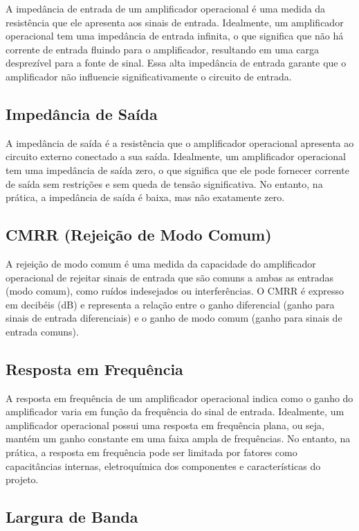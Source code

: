 \documentclass[12pt,twoside, a4paper, twocolumn]{article}
\begin{document}
A impedância de entrada de um amplificador operacional é uma medida da resistência que ele apresenta aos sinais de entrada. Idealmente, um amplificador operacional tem uma impedância de entrada infinita, o que significa que não há corrente de entrada fluindo para o amplificador, resultando em uma carga desprezível para a fonte de sinal. Essa alta impedância de entrada garante que o amplificador não influencie significativamente o circuito de entrada.

\subsection{Impedância de Saída}

A impedância de saída é a resistência que o amplificador operacional apresenta ao circuito externo conectado a sua saída. Idealmente, um amplificador operacional tem uma impedância de saída zero, o que significa que ele pode fornecer corrente de saída sem restrições e sem queda de tensão significativa. No entanto, na prática, a impedância de saída é baixa, mas não exatamente zero.

\subsection{CMRR (Rejeição de Modo Comum)}

A rejeição de modo comum é uma medida da capacidade do amplificador operacional de rejeitar sinais de entrada que são comuns a ambas as entradas (modo comum), como ruídos indesejados ou interferências. O CMRR é expresso em decibéis (dB) e representa a relação entre o ganho diferencial (ganho para sinais de entrada diferenciais) e o ganho de modo comum (ganho para sinais de entrada comuns).

\subsection{Resposta em Frequência}

A resposta em frequência de um amplificador operacional indica como o ganho do amplificador varia em função da frequência do sinal de entrada. Idealmente, um amplificador operacional possui uma resposta em frequência plana, ou seja, mantém um ganho constante em uma faixa ampla de frequências. No entanto, na prática, a resposta em frequência pode ser limitada por fatores como capacitâncias internas, eletroquímica dos componentes e características do projeto.

\subsection{Largura de Banda}
\end{document}
